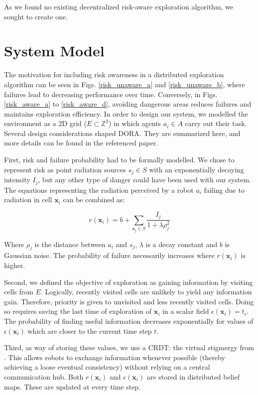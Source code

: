As we found no existing decentralized risk-aware exploration algorithm, we sought to create one.


\section{System Model}
\label{dora_system_model}

The motivation for including risk awareness in a distributed exploration algorithm can be seen in Figs. \ref{risk_unaware_a} and \ref{risk_unaware_b}, where failures lead to decreasing performance over time. Conversely, in Figs. \ref{risk_aware_a} to \ref{risk_aware_d}, avoiding dangerous areas reduces failures and maintains exploration efficiency. In order to design our system, we modelled the environment as a 2D grid ($E \subset \mathbb{Z}^2$) in which agents $a_i \in A$ carry out their task. Several design considerations shaped \ac{DORA}. They are summarized here, and more details can be found in the referenced paper.

\FloatBarrier

First, risk and failure probability had to be formally modelled. We chose to represent risk as point radiation sources $s_j \in S$ with an exponentially decaying intensity $I_j$, but any other type of danger could have been used with our system. The equations representing the radiation perceived by a robot $a_i$ failing due to radiation in cell $\bm{x}_i$ can be combined as:

\begin{equation}
    r(\bm{x}_i) = b + \sum_{\bm{s}_j \in S} \frac{I_j}{1 + \lambda\rho_j^2}
    \label{eq:radiation_dora}
\end{equation}

Where $\rho_j$ is the distance between $a_i$ and $s_j$, $\lambda$ is a decay constant and $b$ is Gaussian noise. The probability of failure necessarily increases where $r(\bm{x}_i)$ is higher.

Second, we defined the objective of exploration as gaining information by visiting cells from $E$. Logically, recently visited cells are unlikely to yield any information gain. Therefore, priority is given to unvisited and less recently visited cells. Doing so requires saving the last time of exploration of $\bm{x}_i$ in a scalar field $\epsilon(\bm{x}_i) = t_\epsilon$. The probability of finding useful information decreases exponentially for values of $\epsilon(\bm{x}_i)$ which are closer to the current time step $t$.

Third, as way of storing these values, we use a \ac{CRDT}: the virtual stigmergy from \cite{pinciroliTuple2016}. This allows robots to exchange information whenever possible (thereby achieving a loose eventual consistency) without relying on a central communication hub. Both $r(\bm{x}_i)$ and $\epsilon(\bm{x}_i)$ are stored in distributed belief maps. These are updated at every time step.

